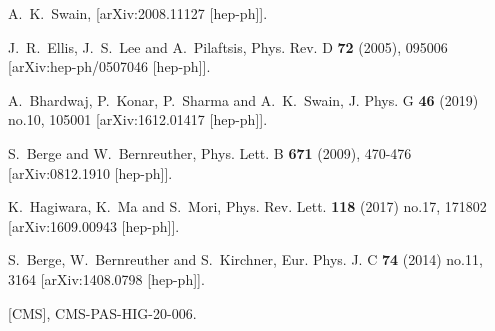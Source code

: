 \documentclass[pdftex,twocolumn,epjc3]{svjour3}          %
\begin{document}
\begin{thebibliography}{9}
A.~K.~Swain,
[arXiv:2008.11127 [hep-ph]].

J.~R.~Ellis, J.~S.~Lee and A.~Pilaftsis,
Phys. Rev. D \textbf{72} (2005), 095006
[arXiv:hep-ph/0507046 [hep-ph]].

A.~Bhardwaj, P.~Konar, P.~Sharma and A.~K.~Swain,
J. Phys. G \textbf{46} (2019) no.10, 105001
[arXiv:1612.01417 [hep-ph]].


S.~Berge and W.~Bernreuther,
Phys. Lett. B \textbf{671} (2009), 470-476
[arXiv:0812.1910 [hep-ph]].

K.~Hagiwara, K.~Ma and S.~Mori,
Phys. Rev. Lett. \textbf{118} (2017) no.17, 171802
[arXiv:1609.00943 [hep-ph]].

S.~Berge, W.~Bernreuther and S.~Kirchner,
Eur. Phys. J. C \textbf{74} (2014) no.11, 3164
[arXiv:1408.0798 [hep-ph]].

[CMS],
CMS-PAS-HIG-20-006.




\end{thebibliography}
\end{document}
